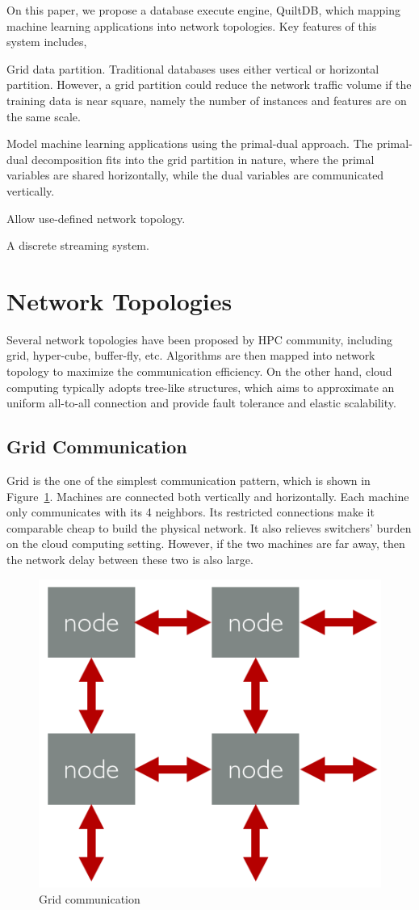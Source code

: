\documentclass{acm_proc_article-sp}
\begin{document}
On this paper, we propose a database execute engine, QuiltDB, which mapping
machine learning applications into network topologies. Key features of this
system includes,

\begin{itemize*}
\item Grid data partition. Traditional databases uses either vertical or
  horizontal partition. However, a grid partition could reduce the network
  traffic volume if the training data is near square, namely the number of
  instances and features are on the same scale.
\item Model machine learning applications using the
  primal-dual approach. The primal-dual decomposition fits into the grid
  partition in nature, where the primal variables are shared horizontally, while
  the dual variables are communicated vertically.
\item Allow use-defined network topology.
\item A discrete streaming system.
\end{itemize*}

\section{Network Topologies}
\label{sec:network-topologies}

Several network topologies have been proposed by HPC community, including grid,
hyper-cube, buffer-fly, etc. Algorithms are then mapped into network topology to
maximize the communication efficiency. On the other hand, cloud computing
typically adopts
tree-like structures, which aims to approximate an uniform all-to-all connection
and provide fault tolerance and elastic scalability.

\subsection{Grid Communication}

Grid is the one of the simplest communication pattern, which is shown in
Figure~\ref{fig:grid2}. Machines are connected both vertically and
horizontally. Each machine only communicates with its 4 neighbors. Its
restricted connections make it comparable cheap to build the physical
network. It also relieves switchers' burden on the cloud computing setting.
However, if the two machines are far away, then the network delay between these
two is also large.

\begin{figure}[th!]
  \centering
  \includegraphics[width=.25\textwidth]{fig/grid}
  \caption{Grid communication}
  \label{fig:grid2}
\end{figure}
\end{document}
